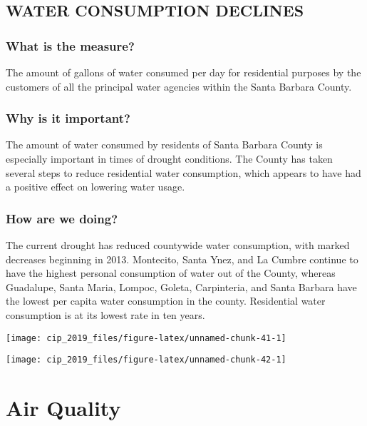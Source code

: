 \documentclass[]{book}
\theoremstyle{definition}
\theoremstyle{definition}
\theoremstyle{definition}
\theoremstyle{remark}
\begin{document}
\subsection*{WATER CONSUMPTION
DECLINES}\label{water-consumption-declines}

\subsubsection*{What is the measure?}\label{what-is-the-measure-17}

The amount of gallons of water consumed per day for residential purposes
by the customers of all the principal water agencies within the Santa
Barbara County.

\subsubsection*{Why is it important?}\label{why-is-it-important-16}

The amount of water consumed by residents of Santa Barbara County is
especially important in times of drought conditions. The County has
taken several steps to reduce residential water consumption, which
appears to have had a positive effect on lowering water usage.

\subsubsection*{How are we doing?}\label{how-are-we-doing-23}

The current drought has reduced countywide water consumption, with
marked decreases beginning in 2013. Montecito, Santa Ynez, and La Cumbre
continue to have the highest personal consumption of water out of the
County, whereas Guadalupe, Santa Maria, Lompoc, Goleta, Carpinteria, and
Santa Barbara have the lowest per capita water consumption in the
county. Residential water consumption is at its lowest rate in ten
years.

\texttt{[image: cip\_2019\_files/figure-latex/unnamed-chunk-41-1]}

\texttt{[image: cip\_2019\_files/figure-latex/unnamed-chunk-42-1]}

\section*{Air Quality}\label{air-quality}
\end{document}
